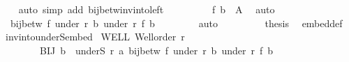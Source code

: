 \begin{isabellebody}
\ {}\ \isamarkupfalse%
\ {\isacharparenleft}{\kern0pt}auto\ simp\ add{\isacharcolon}{\kern0pt}\ bij{\isacharunderscore}{\kern0pt}betw{\isacharunderscore}{\kern0pt}inv{\isacharunderscore}{\kern0pt}into{\isacharunderscore}{\kern0pt}left{\isacharparenright}{\kern0pt}\isanewline
\ \ \ \ \ \isamarkupfalse%
\ {}{}\ \isamarkupfalse%
\ {\isachardoublequoteopen}{\isacharquery}{\kern0pt}f{\isacharprime}{\kern0pt}\ b{\isacharprime}{\kern0pt}\ {\isasymin}\ A{\isachardoublequoteclose}\ \isamarkupfalse%
\ auto\isanewline
\ \ \ \ \isacommand{{\isacharbraceright}{\kern0pt}}\isamarkupfalse%
\isanewline
\ \ \ \ \isamarkupfalse%
\isanewline
\ \ \ \ \isamarkupfalse%
\ \ {\isachardoublequoteopen}bij{\isacharunderscore}{\kern0pt}betw\ {\isacharquery}{\kern0pt}f{\isacharprime}{\kern0pt}\ {\isacharparenleft}{\kern0pt}under\ r{\isacharprime}{\kern0pt}\ b{\isacharprime}{\kern0pt}{\isacharparenright}{\kern0pt}\ {\isacharparenleft}{\kern0pt}under\ r\ {\isacharparenleft}{\kern0pt}{\isacharquery}{\kern0pt}f{\isacharprime}{\kern0pt}\ b{\isacharprime}{\kern0pt}{\isacharparenright}{\kern0pt}{\isacharparenright}{\kern0pt}{\isachardoublequoteclose}\isanewline
\ \ \ \ \isamarkupfalse%
\ {}\ \isamarkupfalse%
\ auto\isanewline
\ \ \isamarkupfalse%
\isanewline
\ \ \isanewline
\ \ \isamarkupfalse%
\ {\isacharquery}{\kern0pt}thesis\ \isamarkupfalse%
\ embed{\isacharunderscore}{\kern0pt}def\ \isacommand{{\isachardot}{\kern0pt}}\isamarkupfalse%
\isanewline
{}\isamarkupfalse%
%
\endisatagproof
{\isafoldproof}%
%
\isadelimproof
\isanewline
%
\endisadelimproof
\isanewline
{}\isamarkupfalse%
\ inv{\isacharunderscore}{\kern0pt}into{\isacharunderscore}{\kern0pt}underS{\isacharunderscore}{\kern0pt}embed{\isacharcolon}{\kern0pt}\isanewline
{}\ WELL{\isacharcolon}{\kern0pt}\ {\isachardoublequoteopen}Well{\isacharunderscore}{\kern0pt}order\ r{\isachardoublequoteclose}\ \isanewline
\ \ \ \ \ \ \ \ BIJ{\isacharcolon}{\kern0pt}\ {\isachardoublequoteopen}{\isasymforall}b\ {\isasymin}\ underS\ r\ a{\isachardot}{\kern0pt}\ bij{\isacharunderscore}{\kern0pt}betw\ f\ {\isacharparenleft}{\kern0pt}under\ r\ b{\isacharparenright}{\kern0pt}\ {\isacharparenleft}{\kern0pt}under\ r{\isacharprime}{\kern0pt}\ {\isacharparenleft}{\kern0pt}f\ b{\isacharparenright}{\kern0pt}{\isacharparenright}{\kern0pt}{\isachardoublequoteclose}\ \isanewline

\end{isabellebody}
